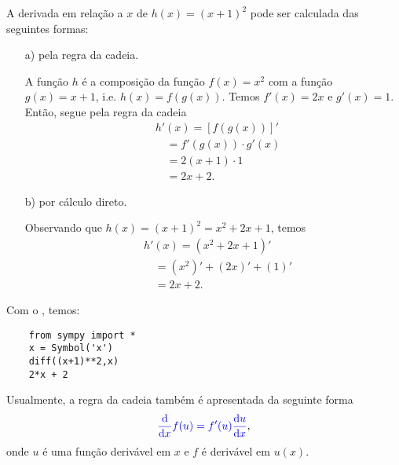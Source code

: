 \begin{ex}
  A derivada em relação a $x$ de $h(x) = (x+1)^2$ pode ser calculada das seguintes formas:
  \begin{enumerate}
  \item[a)] pela regra da cadeia.

    A função $h$ é a composição da função $f(x)=x^2$ com a função $g(x)=x+1$, i.e. $h(x) = f(g(x))$. Temos $f'(x)=2x$ e $g'(x)=1$. Então, segue pela regra da cadeia
    \begin{align}
      & h'(x) = [f(g(x))]' \\
      & \text{}\quad = f'(g(x))\cdot g'(x) \\
      & \text{}\quad = 2(x+1)\cdot 1 \\
      & \text{}\quad = 2x+2.
    \end{align}

  \item[b)] por cálculo direto.

    Observando que $h(x)=(x+1)^2=x^2+2x+1$, temos
    \begin{align}
      & h'(x) = (x^2+2x+1)' \\
      & \text{}\quad = (x^2)' + (2x)' + (1)' \\
      & \text{}\quad = 2x + 2.
    \end{align}
  \end{enumerate}

  \ifispython
  Com o \sympy, temos:
  \begin{lstlisting}
    from sympy import *
    x = Symbol('x')
    diff((x+1)**2,x)
    2*x + 2
  \end{lstlisting}
  \fi  
\end{ex}

Usualmente, a regra da cadeia também é apresentada da seguinte forma
\begin{equation}\label{eq:deriv_regra_da_cadeia}
  {\color{blue}\frac{\mathrm{d}}{\mathrm{d}x}f(u) = f'(u)\frac{\mathrm{d}u}{\mathrm{d}x}},
\end{equation}
onde $u$ é uma função derivável em $x$ e $f$ é derivável em $u(x)$.

